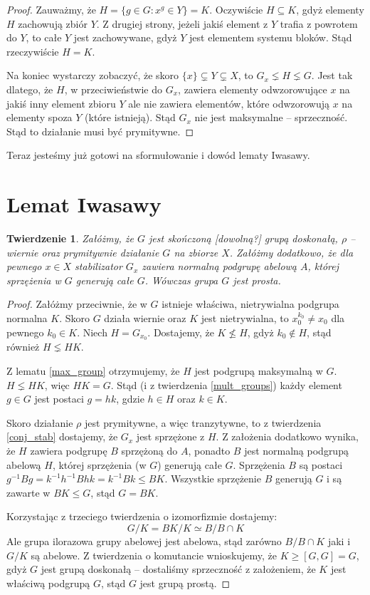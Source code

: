 \documentclass[licencjacka]{pracamgr}
\newtheorem{thh}{Twierdzenie}[section]
\begin{document}
\begin{proof}
Zauważmy, że $H = \{ g \in G \colon x^g \in Y\} = K$. 
Oczywiście $H \subseteq K$, gdyż elementy $H$ zachowują zbiór $Y$.
Z drugiej strony, jeżeli jakiś element z $Y$ trafia z powrotem do $Y$, to całe $Y$ jest zachowywane, 
gdyż $Y$ jest elementem systemu bloków.
Stąd rzeczywiście $H = K$.

Na koniec wystarczy zobaczyć, że skoro $\{x\} \subsetneq  Y \subsetneq X$,
to $G_x \lneq H \lneq G$.
Jest tak dlatego, że $H$, w przeciwieństwie do $G_x$, zawiera elementy odwzorowujące $x$ na jakiś inny element zbioru $Y$
ale nie zawiera elementów, które odwzorowują $x$ na elementy spoza $Y$ (które istnieją).
Stąd $G_x$ nie jest maksymalne -- sprzeczność.
Stąd to działanie musi być prymitywne.
\end{proof}

Teraz jesteśmy już gotowi na sformułowanie i dowód lematy Iwasawy.

\section{Lemat Iwasawy}

\begin{thh}
	Załóżmy, że $G$ jest skończoną [dowolną?] grupą doskonałą, $\rho$ -- wiernie oraz prymitywnie działanie $G$ na zbiorze $X$.
	Załóżmy dodatkowo, że dla pewnego $x \in X$ stabilizator $G_x$ zawiera normalną podgrupę abelową $A$, 
	której sprzężenia w $G$ generują całe $G$.
	Wówczas grupa $G$ jest prosta.
\end{thh}
\begin{proof}
	Załóżmy przeciwnie, że w $G$ istnieje właściwa, nietrywialna podgrupa normalna $K$.
	Skoro $G$ działa wiernie oraz $K$ jest nietrywialna, to $x_0^{k_0} \ne x_0$ dla pewnego $k_0 \in K$.
	Niech $H = G_{x_0}$.
	Dostajemy, że $K \nleq H$, gdyż $k_0 \not \in H$, stąd również $H \lneq H K$.

	Z lematu \ref{max_group} otrzymujemy, że $H$ jest podgrupą maksymalną w $G$.
	$H \lneq H K$, więc $H K = G$.
	Stąd (i z twierdzenia \ref{mult_groups}) każdy element $g \in G$ jest postaci $g = h k$, gdzie $h \in H$ oraz $k \in K$.

	Skoro działanie $\rho$ jest prymitywne, a więc tranzytywne, to z twierdzenia \ref{conj_stab}
	dostajemy, że $G_x$ jest sprzężone z $H$.
	Z założenia dodatkowo wynika, że $H$ zawiera podgrupę $B$ sprzężoną do $A$, 
	ponadto $B$ jest normalną podgrupą abelową $H$, której sprzężenia (w $G$) generują całe $G$.
	Sprzężenia $B$ są postaci $g^{-1} B g = k^{-1} h^{-1} B h k = k^{-1} B k \le B K$.
	Wszystkie sprzężenie $B$ generują $G$ i są zawarte w $B K \le G$, stąd $G = B K$.

	Korzystając z trzeciego twierdzenia o izomorfizmie dostajemy:
	$$ G/K = BK/K \simeq B/B\cap K$$
	Ale grupa ilorazowa grupy abelowej jest abelowa, stąd zarówno $B/B\cap K$ jaki i $G/K$ są abelowe.
	Z twierdzenia o komutancie wnioskujemy, że $K \ge [G, G] = G$, gdyż $G$ jest grupą doskonałą --
	dostaliśmy sprzeczność z założeniem, że $K$ jest właściwą podgrupą $G$, stąd $G$ jest grupą prostą.
\end{proof}
\end{document}
